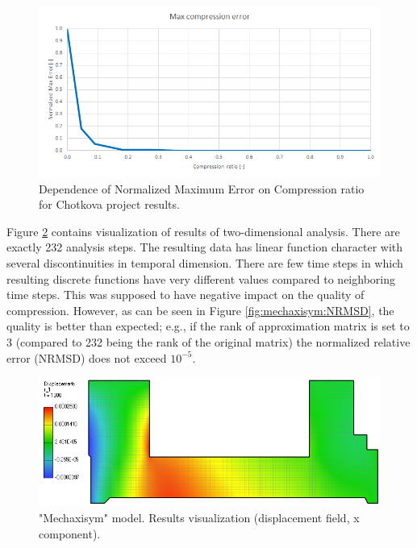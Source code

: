 \begin{figure}[H]
\centering\includegraphics[width=\textwidth]{figures/chotkova_MaxError}
\caption{Dependence of Normalized Maximum Error on Compression ratio for Chotkova project results.}
\label{fig:chotkova:MaxError}
\end{figure}

Figure \ref{fig:mechaxisym:mesh} contains visualization of results of two-dimensional analysis. There are exactly 232 analysis steps. The resulting data has linear function character with several discontinuities in temporal dimension. There are few time steps in which resulting discrete functions have very different values compared to neighboring time steps. This was supposed to have negative impact on the quality of compression. However, as can be seen in Figure \ref{fig:mechaxisym:NRMSD}, the quality is better than expected; e.g., if the rank of approximation matrix is set to 3 (compared to 232 being the rank of the original matrix) the normalized relative error (NRMSD) does not exceed $10^{-5}$.

\begin{figure}[H]
\centering\includegraphics[width=\textwidth]{figures/mechaxisym_screenshot}
\caption{"Mechaxisym" model. Results visualization (displacement field, x component).}
\label{fig:mechaxisym:mesh}
\end{figure}

